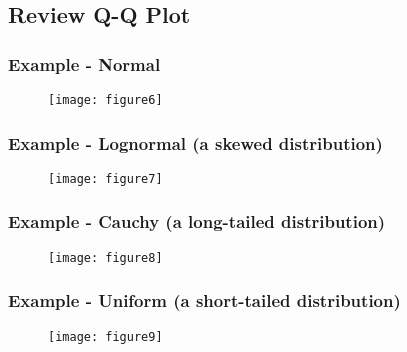 \documentclass[serif,mathserif,professionalfont]{beamer}
\begin{document}
\subsection{Review Q-Q Plot}


\begin{frame}
	
	\frametitle{Example - Normal}
	
	\begin{figure}
		\texttt{[image: figure6]}
	\end{figure}
	
	
	
\end{frame}


\begin{frame}
	
	\frametitle{Example - Lognormal (a skewed distribution)}
	
	\begin{figure}
		\texttt{[image: figure7]}
	\end{figure}
	
	
	
\end{frame}



\begin{frame}
	
	\frametitle{Example - Cauchy (a long-tailed distribution)}
	
	\begin{figure}
		\texttt{[image: figure8]}
	\end{figure}
	
	
	
\end{frame}




\begin{frame}
	
	\frametitle{Example - Uniform (a short-tailed distribution)}
	
	\begin{figure}
		\texttt{[image: figure9]}
	\end{figure}
	
	
	
\end{frame}
\end{document}
